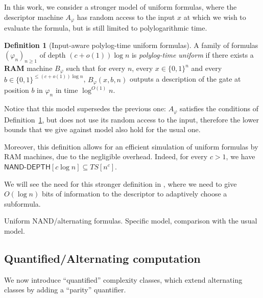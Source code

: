 \documentclass[a4paper, 11pt]{article}
\theoremstyle{plain}
\theoremstyle{definition}
\newtheorem{definition}[theorem]{Definition}
\theoremstyle{remark}
\newcommand{\bit}{\{0,1\}}%
\newcommand{\NAND}{\textsf{NAND}}%
\newcommand{\ND}{\textsf{NAND-DEPTH}}%
\begin{document}
In this work, we consider a stronger model of uniform formulas, 
where the descriptor machine $A_\varphi$ has random access to the input $x$ 
at which we wish to evaluate the formula, but is still limited to polylogarithmic time.
\begin{definition}[Input-aware polylog-time uniform formulas]\label{def:unif}
	A family of formulas $(\varphi_n)_{n \ge 1}$ of depth $(c + o(1))\log n$ is \textit{polylog-time uniform}
	if there exists a \textbf{RAM} machine $B_\varphi$
	such that for every $n$, every $x\in\bit^n$ and every $b\in\bit^{\leq (c + o(1))\log n}$,
	$B_\varphi(x, b, n)$ outputs a description of the gate at position $b$ in $\varphi_n$ in time $\log^{O(1)} n$.
\end{definition}
Notice that this model supersedes the previous one: 
$A_\varphi$ satisfies the conditions of Definition~\ref{def:unif}, 
but does not use its random access to the input, 
therefore the lower bounds that we give against model also hold for the usual one.

Moreover, this definition allows for an efficient simulation of uniform formulas by RAM machines, 
due to the negligible overhead.
Indeed, for every $c > 1$, we have $\ND[c \log n] \subseteq TS[n^c]$.

We will see the need for this stronger definition in , 
where we need to give $O(\log n)$ bits of information to the descriptor
to adaptively choose a subformula.

Uniform \NAND{}/alternating formulas. Specific model, comparison with the usual model.

\subsection{Quantified/Alternating computation}

We now introduce ``quantified'' complexity classes, which extend alternating classes 
by adding a ``parity'' quantifier.
\end{document}
